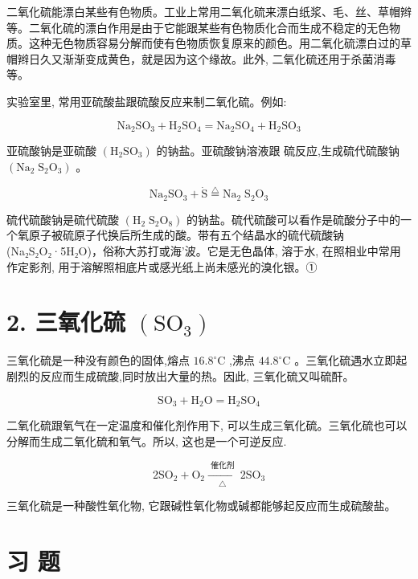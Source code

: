 \documentclass[10pt]{article}
\begin{document}
二氧化硫能漂白某些有色物质。工业上常用二氧化硫来漂白纸浆、毛、丝、草帽辫等。二氧化硫的漂白作用是由于它能跟某些有色物质化合而生成不稳定的无色物质。这种无色物质容易分解而使有色物质恢复原来的颜色。用二氧化硫漂白过的草帽辫日久又渐渐变成黄色，就是因为这个缘故。此外, 二氧化硫还用于杀菌消毒等。

实验室里, 常用亚硫酸盐跟硫酸反应来制二氧化硫。例如:

\[
{\mathrm{{Na}}}_{2}{\mathrm{{SO}}}_{3} + {\mathrm{H}}_{2}{\mathrm{{SO}}}_{4} = {\mathrm{{Na}}}_{2}{\mathrm{{SO}}}_{4} + {\mathrm{H}}_{2}{\mathrm{{SO}}}_{3}
\]

亚硫酸钠是亚硫酸 \(\left( {{\mathrm{H}}_{2}{\mathrm{{SO}}}_{3}}\right)\) 的钠盐。亚硫酸钠溶液跟 硫反应,生成硫代硫酸钠 \(\left( {{\mathrm{{Na}}}_{2}{\mathrm{\;S}}_{2}{\mathrm{O}}_{3}}\right)\) 。

\[
{\mathrm{{Na}}}_{2}{\mathrm{{SO}}}_{3} + \dot{\mathrm{S}}\overset{\bigtriangleup }{ = }{\mathrm{{Na}}}_{2}{\mathrm{\;S}}_{2}{\mathrm{O}}_{3}
\]

硫代硫酸钠是硫代硫酸 \(\left( {{\mathrm{H}}_{2}{\mathrm{\;S}}_{2}{\mathrm{O}}_{8}}\right)\) 的钠盐。硫代硫酸可以看作是硫酸分子中的一个氧原子被硫原子代换后所生成的酸。带有五个结晶水的硫代硫酸钠(Na₂S₂O₂·5H₂O)，俗称大苏打或海'波。它是无色晶体, 溶于水, 在照相业中常用作定影剂, 用于溶解照相底片或感光纸上尚未感光的溴化银。①

\section*{2. 三氧化硫 \(\left( {\mathrm{{SO}}}_{3}\right)\)}

三氧化硫是一种没有颜色的固体,熔点 \({16.8}^{ \circ }\mathrm{C}\) ,沸点 \({44.8}^{ \circ }\mathrm{C}\) 。三氧化硫遇水立即起剧烈的反应而生成硫酸,同时放出大量的热。因此, 三氧化硫又叫硫酐。

\[
{\mathrm{{SO}}}_{3} + {\mathrm{H}}_{2}\mathrm{O} = {\mathrm{H}}_{2}{\mathrm{{SO}}}_{4}
\]

二氧化硫跟氧气在一定温度和催化剂作用下, 可以生成三氧化硫。三氧化硫也可以分解而生成二氧化硫和氧气。所以, 这也是一个可逆反应.

\[
2{\mathrm{{SO}}}_{2} + {\mathrm{O}}_{2}\xrightarrow[\bigtriangleup ]{\text{ 催化剂 }}2{\mathrm{{SO}}}_{3}
\]

三氧化硫是一种酸性氧化物, 它跟碱性氧化物或碱都能够起反应而生成硫酸盐。

\section*{习 题}
\end{document}
